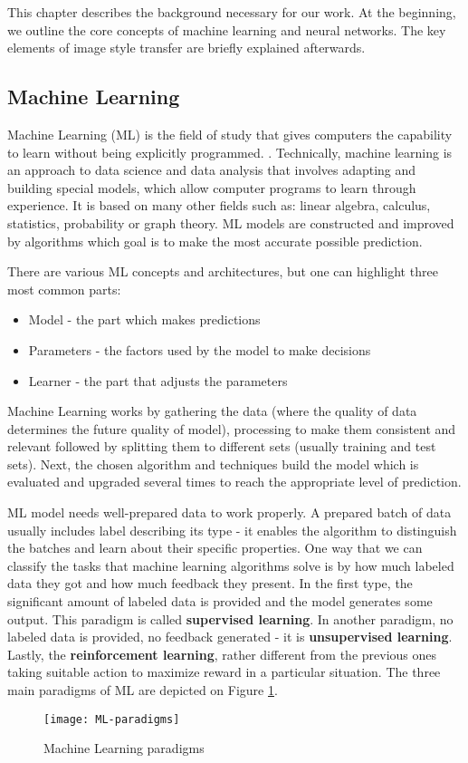 \documentclass[../Main.tex]{subfiles}
\begin{document}
    This chapter describes the background necessary for our work. At the beginning, we outline the core concepts of machine learning and neural networks. The key elements of image style transfer are briefly explained afterwards.

\subsection{Machine Learning} 
    Machine Learning (ML) is the field of study that gives computers the capability to learn without being explicitly programmed. . Technically, machine learning is an approach to data science and data analysis that involves adapting and building special models, which allow computer programs to learn through experience. It is based on many other fields such as: linear algebra, calculus, statistics, probability or graph theory. ML models are constructed and improved by algorithms which goal is to make the most accurate possible prediction.
    
    There are various ML concepts and architectures, but one can highlight three most common parts:
    \begin{itemize}
        \item Model - the part which makes predictions
        \item Parameters - the factors used by the model to make decisions
        \item Learner - the part that adjusts the parameters
    \end{itemize}
    Machine Learning works by gathering the data (where the quality of data determines the future quality of model), processing to make them consistent and relevant followed by splitting them to different sets (usually training and test sets). Next, the chosen algorithm and techniques build the model which is evaluated and upgraded several times to reach the appropriate level of prediction.
    
    ML model needs well-prepared data to work properly. A prepared batch of data usually includes  label describing its type - it enables the algorithm to distinguish the batches and learn about their specific properties. One way that we can classify the tasks that machine learning algorithms solve is by how much labeled data they got and how much feedback they present. In the first type, the significant amount of labeled data is provided and the model generates some output. This paradigm is called \textbf{supervised learning}. In another paradigm, no labeled data is provided, no feedback generated - it is  \textbf{unsupervised learning}. Lastly, the \textbf{reinforcement learning}, rather different from the previous ones taking suitable action to maximize reward in a particular situation. The three main paradigms of ML are depicted on Figure \ref{fig:ML-paradigms}. \\
    \begin{figure}[h]
        \centering
        \texttt{[image: ML-paradigms]}
        \caption{Machine Learning paradigms}
        \label{fig:ML-paradigms}
    \end{figure}
\end{document}
